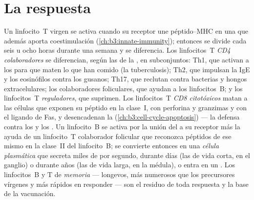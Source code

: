 \section{La respuesta}

\begin{definition}\label{def:b3:adaptive-immunity:response}
Un linfocito~T virgen se activa cuando su receptor une péptido--MHC en
una  que además aporta coestimulación
(\cref{ch:b3:innate-immunity}); entonces se divide cada seis u ocho horas
durante una semana y se diferencia. Los linfocitos~T \emph{CD4
colaboradores} se diferencian, según las  de la , en subconjuntos: Th1, que activan a los  para que
maten lo que han comido (la tuberculosis); Th2, que impulsan la IgE y los
eosinófilos contra los gusanos; Th17, que reclutan  contra
bacterias y hongos extracelulares; los colaboradores foliculares, que
ayudan a los linfocitos~B; y los linfocitos~T \emph{reguladores}, que
suprimen. Los linfocitos~T \emph{CD8 citotóxicos} matan a las células que
exponen su péptido en la clase~I, con perforina y granzimas y con el
ligando de Fas, y desencadenan la 
(\cref{ch:b3:cell-cycle-apoptosis}) --- la defensa contra los  y los
. Un linfocito~B se activa por la unión del  a su receptor
más la ayuda de un linfocito~T colaborador folicular que reconozca
péptidos de ese mismo  en la clase~II del linfocito~B; se
convierte entonces en una \emph{célula plasmática} que secreta miles de
 por segundo, durante días (las de vida corta, en el ganglio)
o durante años (las de vida larga, en la médula), o entra en un . Los linfocitos~B y T de \emph{memoria} --- longevos, más
numerosos que los precursores vírgenes y más rápidos en responder --- son
el residuo de toda respuesta y la base de la vacunación.
\end{definition}

